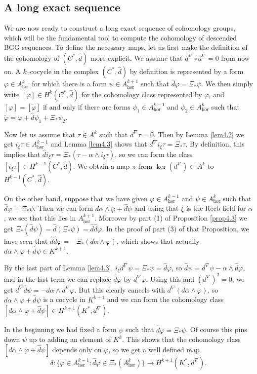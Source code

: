 \documentclass[12pt,a4paper]{amsart}
\let\phi\varphi
\renewcommand{\o}{\circ}
\newcommand{\al}{\alpha}
\newcommand{\ph}{\phi}
\newcommand{\ps}{\psi}
\newcommand{\hor}{\text{hor}}
\numberwithin{theorem}{section}
\theoremstyle{definition}
\theoremstyle{remark}
\begin{document}
\subsection{A long exact sequence}\label{4.4} 
We are now ready to construct a long exact sequence of cohomology
groups, which will be the fundamental tool to compute the cohomology
of descended BGG sequences. To define the necessary maps, let us first
make the definition of the cohomology of $(C^*,\hat d)$ more
explicit. We assume that $d^\nabla\o d^\nabla=0$ from now on. A
$k$--cocycle in the complex $(C^*,\hat d)$ by definition is
represented by a form $\ph\in A^k_\hor$ for which there is a form
$\ps\in A^{k+1}_\hor$ such that $\hat d\ph=\Xi_*\ps$. We then simply
write $[\ph]\in H^k(C^*,\hat d)$ for the cohomology class represented
by $\ph$, and $[\ph]=[\tilde\ph]$ if and only if there are forms
$\ps_1\in A^{k-1}_\hor$ and $\ps_2\in A^k_\hor$ such that
$\tilde\ph=\ph+\hat d\ps_1+\Xi_*\ps_2$.

Now let us assume that $\tau\in A^k$ such that $d^\nabla\tau=0$. Then
by Lemma \ref{lem4.2} we get $i_\xi\tau\in A^{k-1}_\hor$ and Lemma
\ref{lem4.3} shows that $d^\nabla i_\xi\tau=\Xi_*\tau$. By definition,
this implies that $\hat di_\xi\tau=\Xi_*(\tau-\al\wedge i_\xi\tau)$,
so we can form the class $[i_\xi\tau]\in H^{k-1}(C^*,\hat d)$. We
obtain a map $\pi$ from $\ker(d^\nabla)\subset A^k$ to
$H^{k-1}(C^*,\hat d)$.

On the other hand, suppose that we have given $\ph\in A^{k-1}_\hor$
and $\ps\in A^k_\hor$ such that $\hat d\ph=\Xi_*\ps$. Then we can form
$d\al\wedge\ph+\hat d\ps$ and using that $\xi$ is the Reeb field for
$\al$, we see that this lies in $A^{k+1}_\hor$. Moreover by part (1)
of Proposition \ref{prop4.3} we get $\Xi_*(\hat d\ps)=\hat
d(\Xi_*\ps)=\hat d\hat d\ph$. In the proof of part (3) of that
Proposition, we have seen that $\hat d\hat d\ph=-\Xi_*(d\al\wedge\ph)$,
which shows that actually $d\al\wedge\ph+\hat d\ps\in K^{k+1}$.

By the last part of Lemma \ref{lem4.3}, $i_\xi d^\nabla\ps=\Xi_*\ps=\hat
d\ph$, so $\hat d\ps=d^\nabla\ps-\al\wedge\hat d\ph$, and in the last
term we can replace $\hat d\ph$ by $d^\nabla\ph$. Using this and
$(d^\nabla)^2=0$, we get $d^\nabla\hat d\ps=-d\al\wedge
d^\nabla\ph$. But this clearly cancels with $d^\nabla(d\al\wedge\ph)$,
so $d\al\wedge\ph+\hat d\ps$ is a cocycle in $K^{k+1}$ and we can form
the cohomology class $[d\al\wedge\ph+\hat d\ps]\in
H^{k+1}(K^*,d^{\nabla})$.

In the beginning we had fixed a form $\ps$ such that $\hat
d\ph=\Xi_*\ps$. Of course this pins down $\ps$ up to adding an element
of $K^k$. This shows that the cohomology class $[d\al\wedge\ph+\hat
d\ps]$ depends only on $\ph$, so we get a well defined map 
$$
\delta:\{\ph\in A^{k-1}_\hor: \hat d\ph\in \Xi_*(A^k_\hor)\}\to
H^{k+1}(K^*,d^{\nabla}).
$$ 
\end{document}
